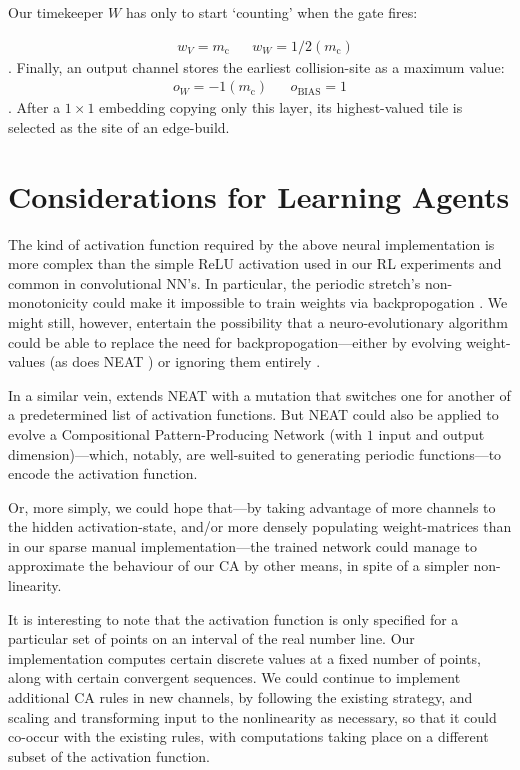 \documentclass{article}
\begin{document}
Our timekeeper $W$ has only to start `counting' when the gate fires:

\begin{align*}
	& w_V = m_\text{c} && w_W = 1/2(m_\text{c})
\end{align*}
. Finally, an output channel stores the earliest collision-site as a maximum value:
\begin{align*}
	o_W = -1(m_\text{c}) && o_{\text{BIAS}} = 1
\end{align*}
. After a $1\times 1$ embedding copying only this layer, its highest-valued tile is selected as the site of an edge-build.



\section{Considerations for Learning Agents}

The kind of activation function required by the above neural implementation is more complex than the simple ReLU activation used in our RL experiments and common in convolutional NN's.
In particular, the periodic stretch's non-monotonicity could make it impossible to train weights via backpropogation \cite{parascandolo2017taming}.
We might still, however, entertain the possibility that a neuro-evolutionary algorithm could be able to replace the need for backpropogation---either by evolving weight-values (as does NEAT \cite{stanley2002evolving}) or ignoring them entirely \cite{gaier2019weight}.

In a similar vein, \cite{hagg2017evolving} extends NEAT with a mutation that switches one for another of a predetermined list of activation functions.
But NEAT could also be applied to evolve a Compositional Pattern-Producing Network \cite{stanley2009hypercube} (with $1$ input and output dimension)---which, notably, are well-suited to generating periodic functions---to encode the activation function.

Or, more simply, we could hope that---by taking advantage of more channels to the hidden activation-state, and/or more densely populating weight-matrices than in our sparse manual implementation---the trained network could manage to approximate the behaviour of our CA by other means, in spite of a simpler non-linearity.

It is interesting to note that the activation function is only specified for a particular set of points on an interval of the real number line.
Our implementation computes certain discrete values at a fixed number of points, along with certain convergent sequences.
We could continue to implement additional CA rules in new channels, by following the existing strategy, and scaling and transforming input to the nonlinearity as necessary, so that it could co-occur with the existing rules, with computations taking place on a different subset of the activation function.
\end{document}
